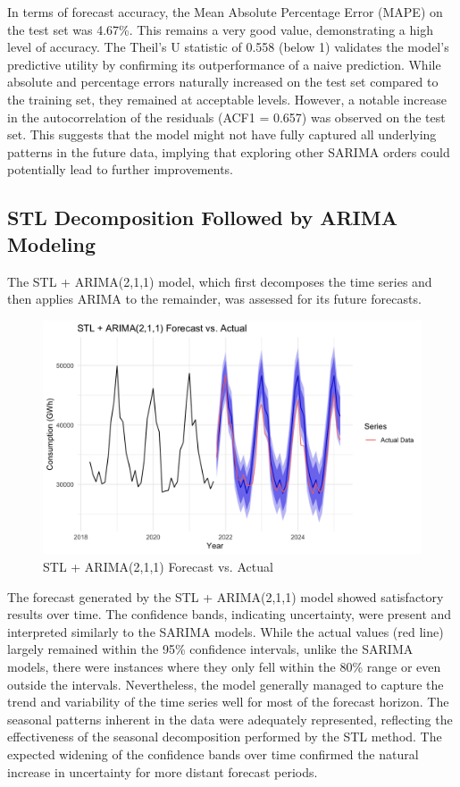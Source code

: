 In terms of forecast accuracy, the Mean Absolute Percentage Error (MAPE) on the test set was 4.67\%. This remains a very good value, demonstrating a high level of accuracy. The Theil's U statistic of 0.558 (below 1) validates the model's predictive utility by confirming its outperformance of a naive prediction. While absolute and percentage errors naturally increased on the test set compared to the training set, they remained at acceptable levels. However, a notable increase in the autocorrelation of the residuals (ACF1 = 0.657) was observed on the test set. This suggests that the model might not have fully captured all underlying patterns in the future data, implying that exploring other SARIMA orders could potentially lead to further improvements.\\

\subsection{STL Decomposition Followed by ARIMA Modeling}

The STL + ARIMA(2,1,1) model, which first decomposes the time series and then applies ARIMA to the remainder, was assessed for its future forecasts.\\

\begin{figure}[H]
    \centering
    \includegraphics[width=1\linewidth]{images/for_stml.png}
    \caption{STL + ARIMA(2,1,1) Forecast vs. Actual}
    \label{fig:enter-label}
\end{figure}

The forecast generated by the STL + ARIMA(2,1,1) model showed satisfactory results over time. The confidence bands, indicating uncertainty, were present and interpreted similarly to the SARIMA models. While the actual values (red line) largely remained within the 95\% confidence intervals, unlike the SARIMA models, there were instances where they only fell within the 80\% range or even outside the intervals. Nevertheless, the model generally managed to capture the trend and variability of the time series well for most of the forecast horizon. The seasonal patterns inherent in the data were adequately represented, reflecting the effectiveness of the seasonal decomposition performed by the STL method. The expected widening of the confidence bands over time confirmed the natural increase in uncertainty for more distant forecast periods.\\

